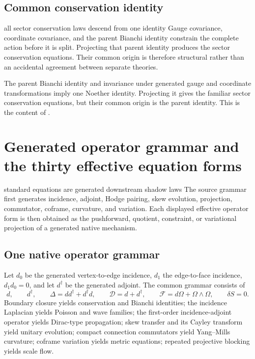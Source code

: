 \documentclass[11pt]{article}
\numberwithin{equation}{section}
\theoremstyle{remark}
\begin{document}
\subsection{Common conservation identity}
\begin{interpretivebridge}{all sector conservation laws descend from one identity}
Gauge covariance, coordinate covariance, and the parent Bianchi identity constrain the complete action before it is split. Projecting that parent identity produces the sector conservation equations. Their common origin is therefore structural rather than an accidental agreement between separate theories.
\end{interpretivebridge}

The parent Bianchi identity and invariance under generated gauge and coordinate transformations imply one Noether identity. Projecting it gives the familiar sector conservation equations, but their common origin is the parent identity. This is the content of .


\section{Generated operator grammar and the thirty effective equation forms}
\label{sec:equationdictionary}
\begin{conceptledger}{standard equations are generated downstream shadow laws}
The source grammar first generates incidence, adjoint, Hodge pairing, skew evolution, projection, commutator, coframe, curvature, and variation. Each displayed effective operator form is then obtained as the pushforward, quotient, constraint, or variational projection of a generated native mechanism.
\end{conceptledger}

\subsection{One native operator grammar}
Let $d_0$ be the generated vertex-to-edge incidence, $d_1$ the edge-to-face incidence, $d_1d_0=0$, and let $d^\dagger$ be the generated adjoint. The common grammar consists of
\begin{equation}
 d,\qquad d^\dagger,\qquad \Delta=dd^\dagger+d^\dagger d,\qquad
 \mathcal D=d+d^\dagger,\qquad
 \mathcal F=d\Omega+\Omega\wedge\Omega,\qquad
 \delta S=0.
\end{equation}
Boundary closure yields conservation and Bianchi identities; the incidence Laplacian yields Poisson and wave families; the first-order incidence-adjoint operator yields Dirac-type propagation; skew transfer and its Cayley transform yield unitary evolution; compact connection commutators yield Yang--Mills curvature; coframe variation yields metric equations; repeated projective blocking yields scale flow.
\end{document}
